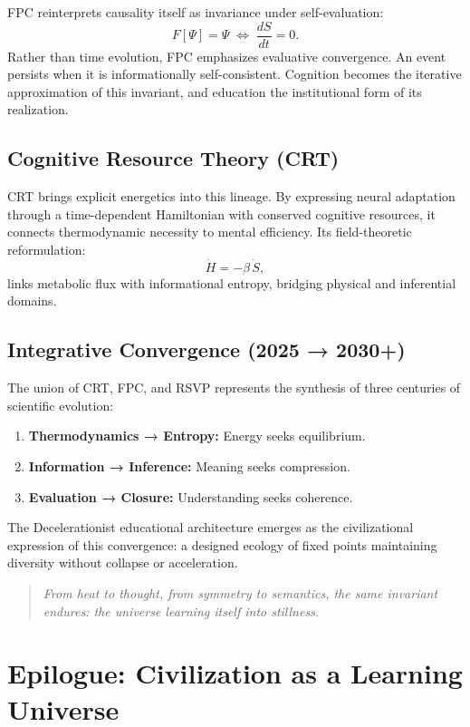 \documentclass[12pt,a4paper]{article}
\begin{document}
FPC reinterprets causality itself as invariance under self-evaluation:
\[
F[\Psi]=\Psi
\;\Longleftrightarrow\;
\frac{dS}{dt}=0.
\]
Rather than time evolution, FPC emphasizes evaluative convergence.
An event persists when it is informationally self-consistent.
Cognition becomes the iterative approximation of this invariant,
and education the institutional form of its realization.

\subsection{Cognitive Resource Theory (CRT)}

CRT brings explicit energetics into this lineage.
By expressing neural adaptation through a time-dependent Hamiltonian
with conserved cognitive resources, it connects
thermodynamic necessity to mental efficiency.
Its field-theoretic reformulation:
\[
\dot H = -\beta\,\dot S,
\]
links metabolic flux with informational entropy,
bridging physical and inferential domains.

\subsection{Integrative Convergence (2025 → 2030+)}

The union of CRT, FPC, and RSVP represents the synthesis of
three centuries of scientific evolution:

\begin{enumerate}[leftmargin=1.2em]
  \item \textbf{Thermodynamics → Entropy:} Energy seeks equilibrium.
  \item \textbf{Information → Inference:} Meaning seeks compression.
  \item \textbf{Evaluation → Closure:} Understanding seeks coherence.
\end{enumerate}

The Decelerationist educational architecture emerges as
the civilizational expression of this convergence:
a designed ecology of fixed points maintaining diversity
without collapse or acceleration.

\begin{quote}
\emph{From heat to thought, from symmetry to semantics,  
the same invariant endures: the universe learning itself into stillness.}
\end{quote}

\section{Epilogue: Civilization as a Learning Universe}
\end{document}
